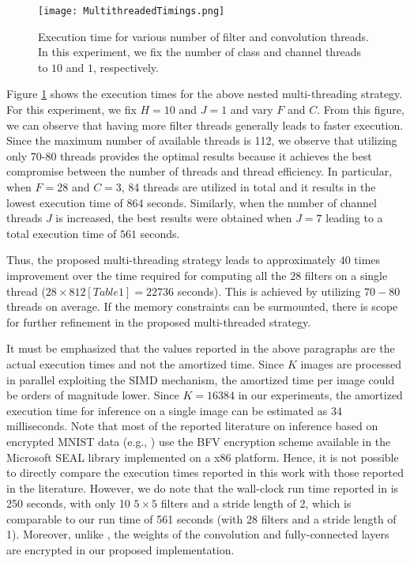 \documentclass[letterpaper]{article} %
\begin{document}
\begin{figure}
    \begin{center}
    \texttt{[image: MultithreadedTimings.png]}
    \caption{Execution time for various number of filter and convolution threads. In this experiment, we fix the number of class and channel threads to $10$ and $1$, respectively.}\label{fig:MultiThreadedTimings}
    \end{center}
\end{figure}

Figure \ref{fig:MultiThreadedTimings} shows the execution times for the above nested multi-threading strategy. For this experiment, we fix $H=10$ and $J=1$ and vary $F$ and $C$. From this figure, we can observe that having more filter threads generally leads to faster execution. Since the maximum number of available threads is 112, we observe that utilizing only 70-80 threads provides the optimal results because it achieves the best compromise between the number of threads and thread efficiency. In particular, when $F = 28$ and $C = 3$, 84 threads are utilized in total and it results in the lowest execution time of $864$ seconds. Similarly, when the number of channel threads $J$ is increased, the best results were obtained when $J=7$ leading to a total execution time of $561$ seconds.

Thus, the proposed multi-threading strategy leads to approximately $40$ times improvement over the time required for computing all the $28$ filters on a single thread ($28 \times 812 [Table 1] = 22736$ seconds). This is achieved by utilizing $70-80$ threads on average. If the memory constraints can be surmounted, there is scope for further refinement in the proposed multi-threaded strategy.

It must be emphasized that the values reported in the above paragraphs are the actual execution times and not the amortized time. Since $K$ images are processed in parallel exploiting the SIMD mechanism, the amortized time per image could be orders of magnitude lower. Since $K = 16384$ in our experiments, the amortized execution time for inference on a single image can be estimated as $34$ milliseconds. Note that most of the reported literature on inference based on encrypted MNIST data (e.g., \cite{gilad2016cryptonets,fastercryptonets}) use the BFV encryption scheme available in the Microsoft SEAL library implemented on a x86 platform. Hence, it is not possible to directly compare the execution times reported in this work with those reported in the literature. However, we do note that the wall-clock run time reported in \cite{gilad2016cryptonets} is 250 seconds, with only 10 $5 \times 5$ filters and a stride length of 2, which is comparable to our run time of 561 seconds (with 28 filters and a stride length of 1). Moreover, unlike \cite{gilad2016cryptonets}, the weights of the convolution and fully-connected layers are encrypted in our proposed implementation.
\end{document}
